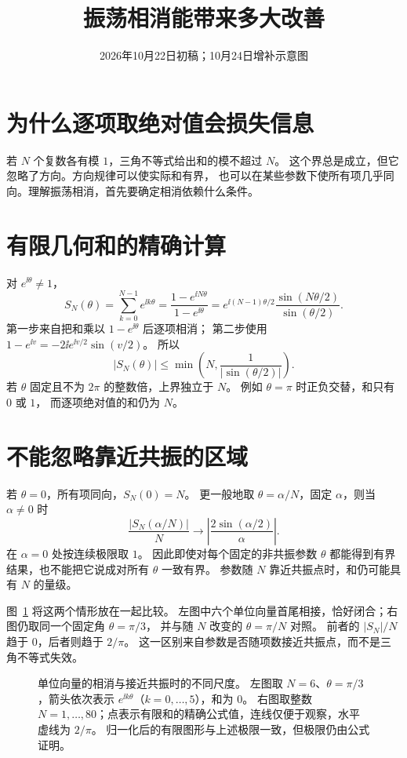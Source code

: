 \documentclass[UTF8,fontset=fandol,11pt]{ctexart}
\date{2026年10月22日初稿；10月24日增补示意图}
\title{振荡相消能带来多大改善}
\begin{document}
\maketitle
\draftnotice
\section{为什么逐项取绝对值会损失信息}
若 $N$ 个复数各有模 $1$，三角不等式给出和的模不超过 $N$。
这个界总是成立，但它忽略了方向。方向规律可以使实际和有界，
也可以在某些参数下使所有项几乎同向。理解振荡相消，首先要确定相消依赖什么条件。

\section{有限几何和的精确计算}
对 $e^{\ii\theta}\ne1$，
\[
 S_N(\theta)=\sum_{k=0}^{N-1}e^{\ii k\theta}
 =\frac{1-e^{\ii N\theta}}{1-e^{\ii\theta}}
 =e^{\ii(N-1)\theta/2}
   \frac{\sin(N\theta/2)}{\sin(\theta/2)}.
\]
第一步来自把和乘以 $1-e^{\ii\theta}$ 后逐项相消；
第二步使用 $1-e^{\ii v}=-2\ii e^{\ii v/2}\sin(v/2)$。
所以
\[
 |S_N(\theta)|\le
 \min\left(N,\frac1{|\sin(\theta/2)|}\right).
\]
若 $\theta$ 固定且不为 $2\pi$ 的整数倍，上界独立于 $N$。
例如 $\theta=\pi$ 时正负交替，和只有 $0$ 或 $1$，
而逐项绝对值的和仍为 $N$。

\section{不能忽略靠近共振的区域}
若 $\theta=0$，所有项同向，$S_N(0)=N$。
更一般地取 $\theta=\alpha/N$，固定 $\alpha$，则当 $\alpha\ne0$ 时
\[
 \frac{|S_N(\alpha/N)|}{N}
 \longrightarrow\left|\frac{2\sin(\alpha/2)}{\alpha}\right|.
\]
在 $\alpha=0$ 处按连续极限取 $1$。
因此即使对每个固定的非共振参数 $\theta$ 都能得到有界结果，也不能把它说成对所有 $\theta$ 一致有界。
参数随 $N$ 靠近共振点时，和仍可能具有 $N$ 的量级。

图~\ref{fig:cancellation-resonance} 将这两个情形放在一起比较。
左图中六个单位向量首尾相接，恰好闭合；右图仍取同一个固定角 $\theta=\pi/3$，
并与随 $N$ 改变的 $\theta=\pi/N$ 对照。
前者的 $|S_N|/N$ 趋于 $0$，后者则趋于 $2/\pi$。
这一区别来自参数是否随项数接近共振点，而不是三角不等式失效。

\begin{figure}[H]
\centering

\caption{单位向量的相消与接近共振时的不同尺度。
左图取 $N=6$、$\theta=\pi/3$，箭头依次表示 $e^{\ii k\theta}$（$k=0,\ldots,5$），和为 $0$。
右图取整数 $N=1,\ldots,80$；点表示有限和的精确公式值，连线仅便于观察，水平虚线为 $2/\pi$。
归一化后的有限图形与上述极限一致，但极限仍由公式证明。}
\label{fig:cancellation-resonance}
\end{figure}
\end{document}
